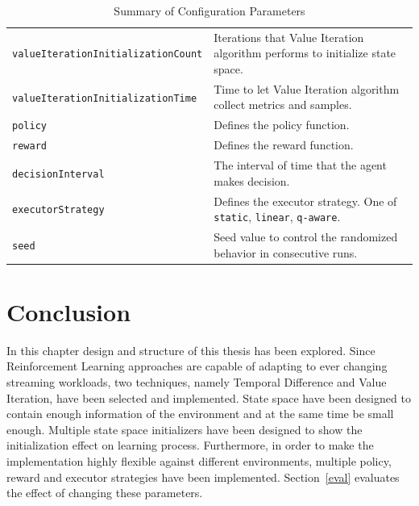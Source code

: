 \begin{table}[h]
\begin{tabularx}{\textwidth}{lX}
        \lstinline|valueIterationInitializationCount| & Iterations that Value Iteration algorithm performs to initialize state space.\\
        \lstinline|valueIterationInitializationTime| & Time to let Value Iteration algorithm collect metrics and samples. \\
        \lstinline|policy| & Defines the policy function.\\
        \lstinline|reward| & Defines the reward function.\\
        \lstinline|decisionInterval| & The interval of time that the agent makes decision. \\
        \lstinline|executorStrategy| & Defines the executor strategy. One of \lstinline|static|, \lstinline|linear|, \lstinline|q-aware|. \\
        \lstinline|seed| & Seed value to control the randomized behavior in consecutive runs.\\
        \bottomrule
    \end{tabularx}
    \centering
    \caption{Summary of Configuration Parameters}
    \label{des:tab:config}
\end{table}

\section{Conclusion}
\label{des:conc}
In this chapter design and structure of this thesis has been explored. Since Reinforcement Learning approaches are capable of adapting to ever changing streaming workloads, two techniques, namely Temporal Difference and Value Iteration, have been selected and implemented. State space have been designed to contain enough information of the environment and at the same time be small enough. Multiple state space initializers have been designed to show the initialization effect on learning process. Furthermore, in order to make the implementation highly flexible against different environments, multiple policy, reward and executor strategies have been implemented. Section~\ref{eval} evaluates the effect of changing these parameters. 